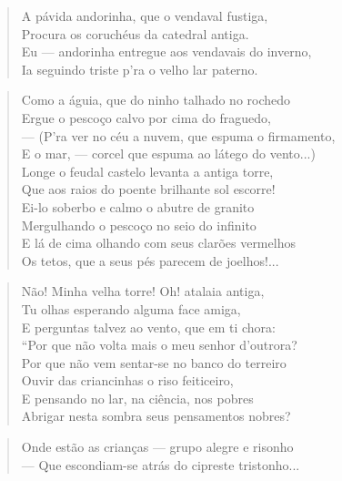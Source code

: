 \begin{anexosenv}
\begin{verse}
A pávida andorinha, que o vendaval fustiga, \\
Procura os coruchéus da catedral antiga. \\
Eu — andorinha entregue aos vendavais do inverno, \\
Ia seguindo triste p'ra o velho lar paterno. \\
\end{verse}

\begin{verse}
Como a águia, que do ninho talhado no rochedo \\
Ergue o pescoço calvo por cima do fraguedo, \\
— (P'ra ver no céu a nuvem, que espuma o firmamento, \\
E o mar, — corcel que espuma ao látego do vento...) \\
Longe o feudal castelo levanta a antiga torre, \\
Que aos raios do poente brilhante sol escorre! \\
Ei-lo soberbo e calmo o abutre de granito \\
Mergulhando o pescoço no seio do infinito \\
E lá de cima olhando com seus clarões vermelhos \\
Os tetos, que a seus pés parecem de joelhos!... \\
\end{verse}

\begin{verse}
Não! Minha velha torre! Oh! atalaia antiga, \\
Tu olhas esperando alguma face amiga, \\
E perguntas talvez ao vento, que em ti chora: \\
``Por que não volta mais o meu senhor d'outrora? \\
Por que não vem sentar-se no banco do terreiro \\
Ouvir das criancinhas o riso feiticeiro, \\
E pensando no lar, na ciência, nos pobres \\
Abrigar nesta sombra seus pensamentos nobres? \\
\end{verse}

\begin{verse}
Onde estão as crianças — grupo alegre e risonho \\
— Que escondiam-se atrás do cipreste tristonho... \\
\end{verse}


\end{anexosenv}
